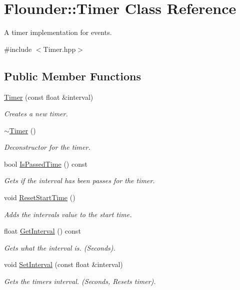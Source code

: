 \hypertarget{class_flounder_1_1_timer}{}\section{Flounder\+:\+:Timer Class Reference}
\label{class_flounder_1_1_timer}


A timer implementation for events.  




{\ttfamily \#include $<$Timer.\+hpp$>$}

\subsection*{Public Member Functions}
\begin{DoxyCompactItemize}
\item 
\hyperlink{class_flounder_1_1_timer_ab21eb1887372627b81f36cbfa1d021ac}{Timer} (const float \&interval)
\begin{DoxyCompactList}\small\item\em Creates a new timer. \end{DoxyCompactList}\item 
\hyperlink{class_flounder_1_1_timer_a0c54e5bb581591dce3a6f4d2c13e3ca3}{$\sim$\+Timer} ()
\begin{DoxyCompactList}\small\item\em Deconstructor for the timer. \end{DoxyCompactList}\item 
bool \hyperlink{class_flounder_1_1_timer_af8e56149f5d58d1c4b3b2d412fb46540}{Is\+Passed\+Time} () const
\begin{DoxyCompactList}\small\item\em Gets if the interval has been passes for the timer. \end{DoxyCompactList}\item 
void \hyperlink{class_flounder_1_1_timer_aad6123dfd293b81644d14f21ead665c7}{Reset\+Start\+Time} ()
\begin{DoxyCompactList}\small\item\em Adds the intervals value to the start time. \end{DoxyCompactList}\item 
float \hyperlink{class_flounder_1_1_timer_a5178fa6167df6f183c30cb18cc97c536}{Get\+Interval} () const
\begin{DoxyCompactList}\small\item\em Gets what the interval is. (Seconds). \end{DoxyCompactList}\item 
void \hyperlink{class_flounder_1_1_timer_a31cbcf9de36dbb3b18634108f32ebb5d}{Set\+Interval} (const float \&interval)
\begin{DoxyCompactList}\small\item\em Gets the timers interval. (Seconds, Resets timer). \end{DoxyCompactList}\end{DoxyCompactItemize}
